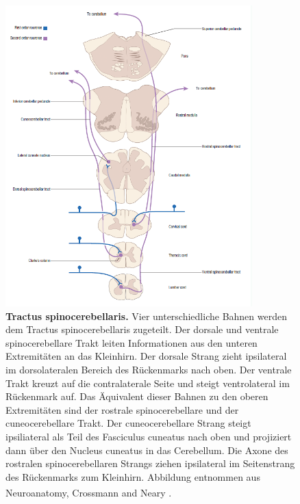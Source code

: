\documentclass[12pt,a4paper,pdftex]{article}
\begin{document}
\begin{figure}[H]
    \centering
    \includegraphics[width=0.85\textwidth]{pictures/Bilder_Laura/spinocerebellar_tract.PNG}
    \caption[Tractus spinocerebellaris]{\textbf{Tractus spinocerebellaris.} Vier unterschiedliche Bahnen werden dem Tractus spinocerebellaris zugeteilt. Der dorsale und ventrale spinocerebellare Trakt leiten Informationen aus den unteren Extremitäten an das Kleinhirn. Der dorsale Strang zieht ipsilateral im dorsolateralen Bereich des Rückenmarks nach oben. Der ventrale Trakt kreuzt auf die contralaterale Seite und steigt ventrolateral im Rückenmark auf. Das Äquivalent dieser Bahnen zu den oberen Extremitäten sind der rostrale spinocerebellare und der cuneocerebellare Trakt. Der cuneocerebellare Strang steigt ipsiliateral als Teil des Fasciculus cuneatus nach oben und projiziert dann über den Nucleus cuneatus in das Cerebellum. Die Axone des rostralen spinocerebellaren Strangs ziehen ipsilateral im Seitenstrang des Rückenmarks zum Kleinhirn. Abbildung entnommen aus Neuroanatomy, Crossmann and Neary \textsuperscript{\cite[8]{crossman2014neuroanatomy}}.}
    \label{fig:tr_spinocerebellaris}
\end{figure}
\end{document}
